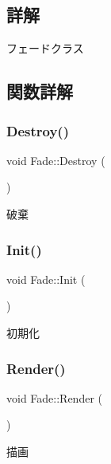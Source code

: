 \subsection{詳解}
フェードクラス 

\subsection{関数詳解}
\mbox{\label{class_fade_afd5cce157c2876a800ea59b2648547c2}} 
\subsubsection{\texorpdfstring{Destroy()}{Destroy()}}
{\footnotesize\ttfamily void Fade\+::\+Destroy (\begin{DoxyParamCaption}{ }\end{DoxyParamCaption})}



破棄 

\mbox{\label{class_fade_ac2a47819e1390abcae3259bcb42bddf5}} 
\subsubsection{\texorpdfstring{Init()}{Init()}}
{\footnotesize\ttfamily void Fade\+::\+Init (\begin{DoxyParamCaption}{ }\end{DoxyParamCaption})}



初期化 

\mbox{\label{class_fade_abfe024be1a10d4849582adf58fe6682a}} 
\subsubsection{\texorpdfstring{Render()}{Render()}}
{\footnotesize\ttfamily void Fade\+::\+Render (\begin{DoxyParamCaption}{ }\end{DoxyParamCaption})}



描画 

\mbox{\label{class_fade_aaf97d1ac502c86612a97fde0e2fbf308}} 
